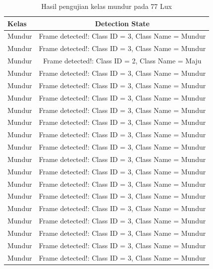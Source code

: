 \begin{longtable}{|l|c|}
  \caption{Hasil pengujian kelas mundur pada 77 Lux}
  \label{tb:lux77mundur} \\
  \hline
  \rowcolor[HTML]{C0C0C0} 
  \textbf{Kelas} & \textbf{Detection State}                           \\ \hline
  Mundur         & Frame detected!: Class ID = 3, Class Name = Mundur \\ \hline
  Mundur         & Frame detected!: Class ID = 3, Class Name = Mundur \\ \hline
  Mundur         & Frame detected!: Class ID = 2, Class Name = Maju   \\ \hline
  Mundur         & Frame detected!: Class ID = 3, Class Name = Mundur \\ \hline
  Mundur         & Frame detected!: Class ID = 3, Class Name = Mundur \\ \hline
  Mundur         & Frame detected!: Class ID = 3, Class Name = Mundur \\ \hline
  Mundur         & Frame detected!: Class ID = 3, Class Name = Mundur \\ \hline
  Mundur         & Frame detected!: Class ID = 3, Class Name = Mundur \\ \hline
  Mundur         & Frame detected!: Class ID = 3, Class Name = Mundur \\ \hline
  Mundur         & Frame detected!: Class ID = 3, Class Name = Mundur \\ \hline
  Mundur         & Frame detected!: Class ID = 3, Class Name = Mundur \\ \hline
  Mundur         & Frame detected!: Class ID = 3, Class Name = Mundur \\ \hline
  Mundur         & Frame detected!: Class ID = 3, Class Name = Mundur \\ \hline
  Mundur         & Frame detected!: Class ID = 3, Class Name = Mundur \\ \hline
  Mundur         & Frame detected!: Class ID = 3, Class Name = Mundur \\ \hline
  Mundur         & Frame detected!: Class ID = 3, Class Name = Mundur \\ \hline
  Mundur         & Frame detected!: Class ID = 3, Class Name = Mundur \\ \hline
  Mundur         & Frame detected!: Class ID = 3, Class Name = Mundur \\ \hline
  Mundur         & Frame detected!: Class ID = 3, Class Name = Mundur \\ \hline

\end{longtable}
